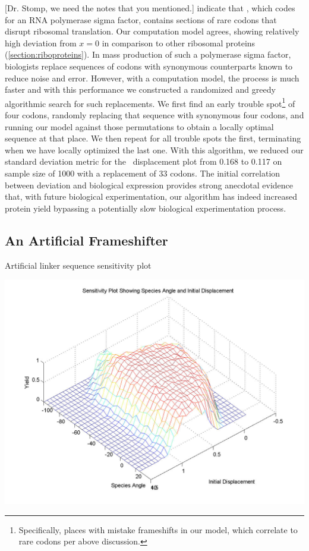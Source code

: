 \documentclass[12pt]{article}
\numberwithin{equation}{section}
\begin{document}
[Dr. Stomp, we need the notes that you mentioned.]
\citet{rpoS:process} indicate that \rpoS, which codes for an RNA
polymerase sigma factor, contains sections of rare codons that disrupt
ribosomal translation. Our computation model agrees, showing
relatively high deviation from $x = 0$ in comparison to other
ribosomal proteins (\autoref{section:riboproteins}). In mass
production of such a polymerase sigma factor, biologists replace
sequences of codons with synonymous counterparts known to reduce noise
and error. However, with a computation model, the process is much
faster and with this performance we constructed a randomized and greedy
algorithmic search for such replacements. We first find an
early trouble spot\footnote{Specifically, places with mistake
  frameshifts in our model, which correlate to rare codons per above
  discussion.} of four codons, randomly replacing that sequence with
synonymous four codons, and running our model against those
permutations to obtain a locally optimal sequence at that place. We
then repeat for all trouble spots the first, terminating when we have
locally optimized the last one. With this algorithm, we reduced our
standard deviation metric for the \rpoS\ displacement plot from 0.168
to 0.117 on sample size of 1000 with a replacement of 33 codons. The
initial correlation between deviation and biological expression
provides strong anecdotal evidence that, with future biological
experimentation, our algorithm has indeed increased protein yield
bypassing a potentially slow biological experimentation process.

\subsection{An Artificial Frameshifter}
\begin{cfigure}
  \caption{Artificial linker sequence sensitivity plot}
  \label{linker:sens}
  \includegraphics[scale=0.25]{linker/sensitivity}
\end{cfigure}
\end{document}
